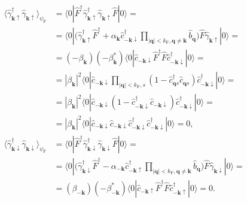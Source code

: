 \documentclass[english, parskip=full]{scrartcl}
\renewcommand{\bra}{}
\renewcommand{\braket}{}
\newcommand{\kla}{}
\newcommand{\tecxt}{}
\begin{document}
\begin{align}
\bra\langle \hat{\gamma}_{\mathbf{k}\uparrow}^\dagger \hat{\gamma}_{\mathbf{k}\uparrow} \rangle_{\psi_\tecxt\text{F}} &= \braket\langle 0 | \hat{F}^\dagger \hat{\gamma}_{\mathbf{k}\uparrow}^\dagger \hat{\gamma}_{\mathbf{k}\uparrow} \hat{F} | 0 \rangle = \\
&= \braket\langle 0 | \kla\Big( \hat{\gamma}_{\mathbf{k}\uparrow}^\dagger \hat{F}^\dagger + \alpha_\textbf{k} \hat{c}_{-\textbf{k}\downarrow}^\dagger \prod_{|\textbf{q}| < k_\tecxt\text{F}, \textbf{q}\neq \textbf{k}} \hat{b}_{\textbf{q}}  \Big) \hat{F} \hat{\gamma}_{\mathbf{k}\uparrow} | 0 \rangle = \\
&= (-\beta_\textbf{k}) (-\beta_\textbf{k}^\ast) \braket\langle 0 |  \hat{c}_{-\textbf{k}\downarrow} \hat{F}^\dagger\hat{F} \hat{c}_{-\textbf{k}\downarrow}^\dagger | 0 \rangle = \\
&= |\beta_\textbf{k}|^2  \braket\langle 0 | \hat{c}_{-\textbf{k}\downarrow} \prod_{|\textbf{q}| < k_\tecxt\text{F},s} \kla\left( 1 - \hat{c}_{\textbf{q}s}^\dagger \hat{c}_{\textbf{q}s} \right) \hat{c}_{-\textbf{k}\downarrow}^\dagger | 0 \rangle = \\
&= |\beta_\textbf{k}|^2 \braket\langle 0 | \hat{c}_{-\textbf{k}\downarrow} \kla\left( 1 - \hat{c}_{-\textbf{k}\downarrow}^\dagger \hat{c}_{-\textbf{k}\downarrow}  \right) \hat{c}_{-\textbf{k}\downarrow}^\dagger  | 0 \rangle = \\
&= |\beta_\textbf{k}|^2 \braket\langle 0 | \hat{c}_{-\textbf{k}\downarrow} \hat{c}_{-\textbf{k}\downarrow} \hat{c}_{-\textbf{k}\downarrow}^\dagger \hat{c}_{-\textbf{k}\downarrow}^\dagger   | 0 \rangle = 0,\\
\bra\langle \hat{\gamma}_{\mathbf{k}\downarrow}^\dagger \hat{\gamma}_{\mathbf{k}\downarrow} \rangle_{\psi_\tecxt\text{F}} &= \braket\langle 0 | \hat{F}^\dagger \hat{\gamma}_{\mathbf{k}\downarrow}^\dagger \hat{\gamma}_{\mathbf{k}\downarrow} \hat{F} | 0 \rangle = \\
&= \braket\langle 0 | \kla\Big( \hat{\gamma}_{\mathbf{k}\downarrow}^\dagger \hat{F}^\dagger - \alpha_{-\textbf{k}} \hat{c}_{-\textbf{k}\uparrow}^\dagger \prod_{|\textbf{q}| < k_\tecxt\text{F}, \textbf{q}\neq \textbf{k}} \hat{b}_{\textbf{q}}  \Big) \hat{F} \hat{\gamma}_{\mathbf{k}\downarrow} | 0 \rangle = \\
&= (\beta_{-\textbf{k}}) (-\beta_{-\textbf{k}}^\ast) \braket\langle 0 |  \hat{c}_{-\textbf{k}\uparrow} \hat{F}^\dagger\hat{F} \hat{c}_{-\textbf{k}\uparrow}^\dagger | 0 \rangle = 0.
\end{align}
\end{document}
